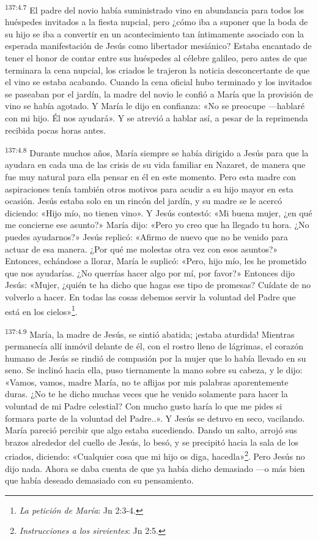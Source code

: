 \par
\textsuperscript{137:4.7} El padre del novio había suministrado vino en abundancia para todos los huéspedes invitados a la fiesta nupcial, pero ¿cómo iba a suponer que la boda de su hijo se iba a convertir en un acontecimiento tan íntimamente asociado con la esperada manifestación de Jesús como libertador mesiánico? Estaba encantado de tener el honor de contar entre sus huéspedes al célebre galileo, pero antes de que terminara la cena nupcial, los criados le trajeron la noticia desconcertante de que el vino se estaba acabando. Cuando la cena oficial hubo terminado y los invitados se paseaban por el jardín, la madre del novio le confió a María que la provisión de vino se había agotado. Y María le dijo en confianza: «No se preocupe ---hablaré con mi hijo. Él nos ayudará». Y se atrevió a hablar así, a pesar de la reprimenda recibida pocas horas antes.

\par
\textsuperscript{137:4.8} Durante muchos años, María siempre se había dirigido a Jesús para que la ayudara en cada una de las crisis de su vida familiar en Nazaret, de manera que fue muy natural para ella pensar en él en este momento. Pero esta madre con aspiraciones tenía también otros motivos para acudir a su hijo mayor en esta ocasión. Jesús estaba solo en un rincón del jardín, y su madre se le acercó diciendo: «Hijo mío, no tienen vino». Y Jesús contestó: «Mi buena mujer, ¿en qué me concierne ese asunto?» María dijo: «Pero yo creo que ha llegado tu hora. ¿No puedes ayudarnos?» Jesús replicó: «Afirmo de nuevo que no he venido para actuar de esa manera. ¿Por qué me molestas otra vez con esos asuntos?» Entonces, echándose a llorar, María le suplicó: «Pero, hijo mío, les he prometido que nos ayudarías. ¿No querrías hacer algo por mí, por favor?» Entonces dijo Jesús: «Mujer, ¿quién te ha dicho que hagas ese tipo de promesas? Cuídate de no volverlo a hacer. En todas las cosas debemos servir la voluntad del Padre que está en los cielos»\footnote{\textit{La petición de María}: Jn 2:3-4.}.

\par
\textsuperscript{137:4.9} María, la madre de Jesús, se sintió abatida; ¡estaba aturdida! Mientras permanecía allí inmóvil delante de él, con el rostro lleno de lágrimas, el corazón humano de Jesús se rindió de compasión por la mujer que lo había llevado en su seno. Se inclinó hacia ella, puso tiernamente la mano sobre su cabeza, y le dijo: «Vamos, vamos, madre María, no te aflijas por mis palabras aparentemente duras. ¿No te he dicho muchas veces que he venido solamente para hacer la voluntad de mi Padre celestial? Con mucho gusto haría lo que me pides si formara parte de la voluntad del Padre..». Y Jesús se detuvo en seco, vacilando. María pareció percibir que algo estaba sucediendo. Dando un salto, arrojó sus brazos alrededor del cuello de Jesús, lo besó, y se precipitó hacia la sala de los criados, diciendo: «Cualquier cosa que mi hijo os diga, hacedla»\footnote{\textit{Instrucciones a los sirvientes}: Jn 2:5.}. Pero Jesús no dijo nada. Ahora se daba cuenta de que ya había dicho demasiado ---o más bien que había deseado demasiado con su pensamiento.

